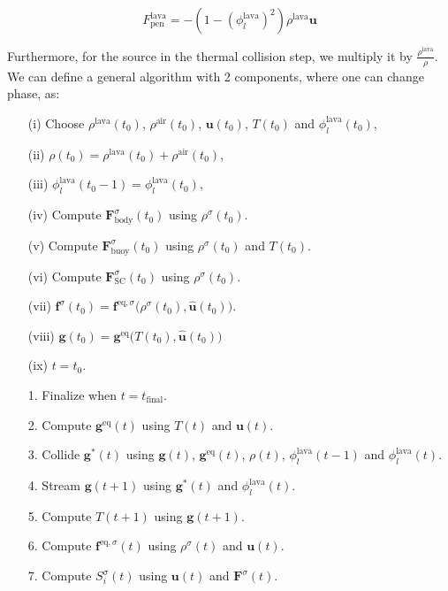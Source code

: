 \begin{equation}
    F_{\text{pen}}^{\text{lava}} = -\left(1 - {\left(\phi_l^{\text{lava}}\right)}^2\right) \rho^{\text{lava}}\bm{u}
\end{equation}

Furthermore, for the source in the thermal collision step, we multiply it by $\frac{\rho^{\text{lava}}}{\rho}$. We can define a general algorithm with 2 components, where one can change phase, as:

\clearpage

\begin{itemize}\label{it:Algorithm phase change in two-component fluid}
    \item[(i)] Choose $\rho^{\text{lava}}(t_0)$, $\rho^{\text{air}}(t_0)$, $\bm{u}(t_0)$, $T(t_0)$ and $\phi_l^{\text{lava}}(t_0)$,
    \item[(ii)] $\rho(t_0) = \rho^{\text{lava}}(t_0) + \rho^{\text{air}}(t_0)$,
    \item[(iii)] $\phi_l^{\text{lava}}(t_0-1) = \phi_l^{\text{lava}}(t_0)$,
    \item[(iv)] Compute $\bm{F}^\sigma_{\text{body}}(t_0)$ using $\rho^\sigma(t_0)$.
    \item[(v)] Compute $\bm{F}^\sigma_{\text{buoy}}(t_0)$ using $\rho^\sigma(t_0)$ and $T(t_0)$.
    \item[(vi)] Compute $\bm{F}^\sigma_{\text{SC}}(t_0)$ using $\rho^\sigma(t_0)$.
    \item[(vii)] $\bm{f}^\sigma(t_0) = \bm{f}^{\text{eq},\sigma}\bigl(\rho^\sigma(t_0), \hat{\bm{u}}(t_0)\bigr)$.
    \item[(viii)] $\bm{g}(t_0) = \bm{g}^{\text{eq}}\bigl(T(t_0), \hat{\bm{u}}(t_0)\bigr)$
    \item[(ix)] $t = t_0$.
    \item[1.] Finalize when $t = t_{\text{final}}$.
    \item[2.] Compute $\bm{g}^{\text{eq}}(t)$ using $T(t)$ and $\bm{u}(t)$.
    \item[3.] Collide $\bm{g}^*(t)$ using $\bm{g}(t)$, $\bm{g}^{\text{eq}}(t)$, $\rho(t)$, $\phi_l^{\text{lava}}(t-1)$ and $\phi_l^{\text{lava}}(t)$.
    \item[4.] Stream $\bm{g}(t+1)$ using $\bm{g}^*(t)$ and $\phi_l^{\text{lava}}(t)$.
    \item[5.] Compute $T(t+1)$ using $\bm{g}(t+1)$.
    \item[6.] Compute $\bm{f}^{\text{eq},\sigma}(t)$ using $\rho^\sigma(t)$ and $\bm{u}(t)$.
    \item[7.] Compute $S_i^\sigma(t)$ using $\bm{u}(t)$ and $\bm{F}^\sigma(t)$. 

\end{itemize}
